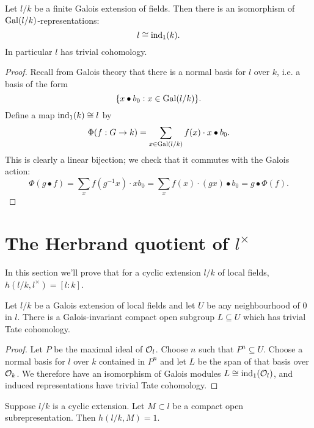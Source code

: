 \begin{theorem}\label{thm:additive field trivial}
	Let $l/k$ be a finite Galois extension of fields.
	Then there is an isomorphism of $\mathrm{Gal}(l/k)$-representations:
	\[
		l \cong \mathrm{ind}_1(k).
	\]
	In particular $l$ has trivial cohomology.
\end{theorem}

\begin{proof}
	Recall from Galois theory that there is a normal basis for $l$ over $k$, i.e. a basis of the
	form
	\[
		\{x \bullet b_0 : x \in \mathrm{Gal}(l/k)\}.
	\]
	Define a map $\mathrm{ind}_1(k) \cong l$ by
	\[
		\Phi (f : G \to k) = \sum_{x \in \mathrm{Gal}(l/k)} f(x) \cdot x \bullet b_0.
	\]
	This is clearly a linear bijection; we check that it commutes with the Galois action:
	\[
		\Phi(g\bullet f)
		= \sum_x f(g^{-1}x) \cdot x b_0
		= \sum_x f(x) \cdot (gx) \bullet b_0
		= g \bullet \Phi(f).
	\]
\end{proof}






\section{The Herbrand quotient of \texorpdfstring{$l^{\times}$}{l*}}

In this section we'll prove that for a cyclic extension $l/k$ of local fields,
$h(l/k,l^\times) = [l:k]$.

\begin{lemma}
	\label{lem:exists additive trivial}
	Let $l/k$ be a Galois extension of local fields and
	let $U$ be any neighbourhood of $0$ in $l$.
	There is a Galois-invariant compact open subgroup $L \subseteq U$
	which has trivial Tate cohomology.
\end{lemma}

\begin{proof}
	Let $P$ be the maximal ideal of ${\mathcal O}_l$.
	Choose $n$ such that $P^n \subseteq U$.
	Choose a normal basis for $l$ over $k$ contained in $P^n$
	and let $L$ be the span of that basis over ${\mathcal O}_k$.
	We therefore have an isomorphism of Galois modules $L \cong \mathrm{ind}_1({\mathcal O}_l)$,
	and induced representations have trivial Tate cohomology.
\end{proof}

\begin{lemma} \label{lem:herbrand compact open additive}
	Suppose $l/k$ is a cyclic extension.
	Let $M \subset l$ be a compact open subrepresentation.
	Then $h(l/k,M)=1$.
\end{lemma}

